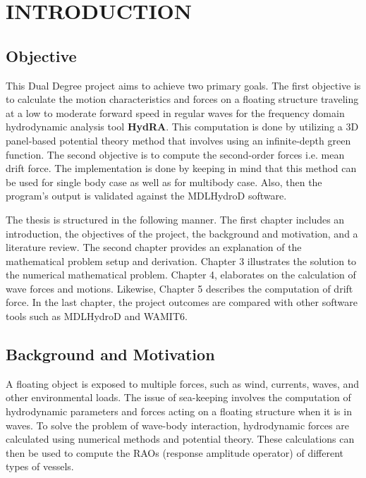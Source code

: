 \chapter{INTRODUCTION}

\section{Objective}
This Dual Degree project aims to achieve two primary goals. The first objective is to calculate 
the motion characteristics and forces on a floating structure traveling at a low to moderate 
forward speed in regular waves for the frequency domain hydrodynamic analysis tool {\bf HydRA}. This computation is done by utilizing a 3D 
panel-based potential theory method that involves using an infinite-depth green function. 
The second objective is to compute the second-order forces i.e. mean drift force. 
The implementation is done by keeping in mind that this method can be used for single body case 
as well as for multibody case. Also, then the program's output is validated against 
the MDLHydroD software.

The thesis is structured in the following manner. The first chapter includes an introduction, 
the objectives of the project, the background and motivation, and a literature review. The second chapter provides an explanation of the 
mathematical problem setup and derivation. Chapter 3 illustrates the solution to the numerical 
mathematical problem. Chapter 4, elaborates on the calculation of wave 
forces and motions. Likewise, Chapter 5 describes 
the computation of drift force. In the last chapter, the project outcomes are compared with 
other software tools such as MDLHydroD and WAMIT6.


\section{Background and Motivation}
A floating object is exposed to multiple forces, such as wind, currents, waves, and other 
environmental loads. The issue of sea-keeping involves the computation of hydrodynamic 
parameters and forces acting on a floating structure when it is in waves. To solve the 
problem of wave-body interaction, hydrodynamic forces are calculated using numerical 
methods and potential theory. These calculations can then be used to compute the RAOs 
(response amplitude operator)
of different types of vessels.

